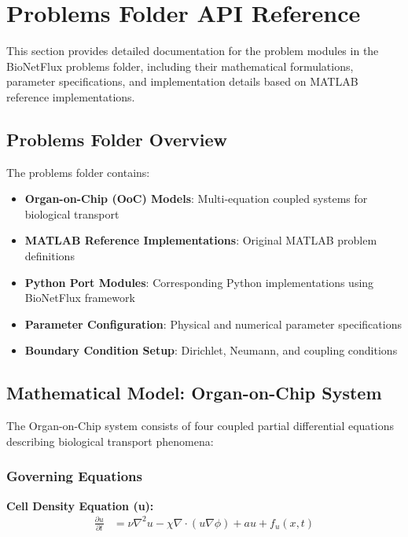 %

\section{Problems Folder API Reference}
\label{sec:problems_folder_api}

This section provides detailed documentation for the problem modules in the BioNetFlux problems folder, including their mathematical formulations, parameter specifications, and implementation details based on MATLAB reference implementations.

\subsection{Problems Folder Overview}

The problems folder contains:
\begin{itemize}
    \item \textbf{Organ-on-Chip (OoC) Models}: Multi-equation coupled systems for biological transport
    \item \textbf{MATLAB Reference Implementations}: Original MATLAB problem definitions
    \item \textbf{Python Port Modules}: Corresponding Python implementations using BioNetFlux framework
    \item \textbf{Parameter Configuration}: Physical and numerical parameter specifications
    \item \textbf{Boundary Condition Setup}: Dirichlet, Neumann, and coupling conditions
\end{itemize}

\subsection{Mathematical Model: Organ-on-Chip System}
\label{subsec:ooc_mathematical_model}

The Organ-on-Chip system consists of four coupled partial differential equations describing biological transport phenomena:

\subsubsection{Governing Equations}

\textbf{Cell Density Equation (u):}
\begin{align}
\frac{\partial u}{\partial t} &= \nu \nabla^2 u - \chi \nabla \cdot (u \nabla \phi) + a u + f_u(x,t)
\end{align}

